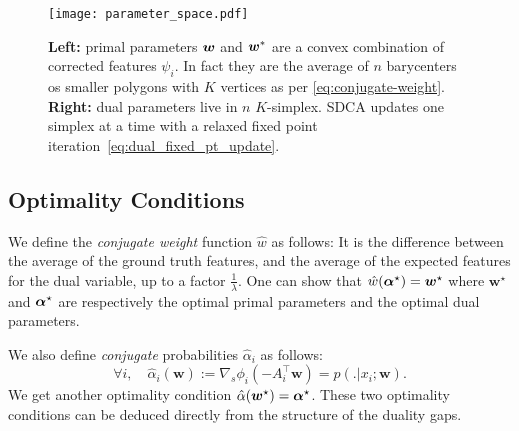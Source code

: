 \begin{figure}[t]
	\centering
	\texttt{[image: parameter\_space.pdf]}
	\caption[
		Illustration of SDCA
	]{
		\textbf{Left:} primal parameters  $\boldsymbol{w}$ and $\boldsymbol{w}^*$ are a convex combination of corrected features $\psi_i$. In fact they are the average of $n$  barycenters os smaller polygons with $K$ vertices as per \eqref{eq:conjugate-weight}.
		\textbf{Right:} dual parameters live in $n$ $K$-simplex. SDCA updates one simplex at a time with a relaxed fixed point iteration~\eqref{eq:dual_fixed_pt_update}.
	}
	\label{fig:sdca}
\end{figure}

\subsection{Optimality Conditions}
We define the \emph{conjugate weight} function $\hat{w}$ as follows:
It is the difference between the average of the ground truth features, and the average of the expected features for the dual variable, up to a factor $\frac{1}{\lambda}$.
One can show that $\hat{w}(\boldsymbol{\alpha}^{\star}) = \bm w^{\star}$ where $\bm w^{\star}$ and $\boldsymbol{\alpha}^{\star}$ are respectively the optimal primal parameters and the optimal dual parameters.

We  also  define  \emph{conjugate} probabilities $\hat{\alpha}_i$ as follows:
\begin{equation}
	\forall i, \quad \hat{\alpha}_i(\bm w) := \nabla_s\phi_i(-A_i^{\top} \bm w) = p(.|x_i; \bm w).
	\label{primal to dual}
\end{equation}
We get another optimality condition $\hat{\alpha}(\bm w^{\star}) = \boldsymbol{\alpha}^{\star}$.
These two optimality conditions can be deduced directly from the structure of the duality gaps.

